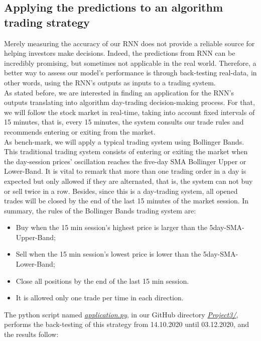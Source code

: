 \subsection{Applying the predictions to an algorithm trading strategy}
\label{chap:Applying the predictions to an algorithm trading strategy}

\quad Merely measuring the accuracy of our RNN does not provide a reliable source for helping investors make decisions. Indeed, the predictions from RNN can be incredibly promising, but sometimes not applicable in the real world. Therefore, a better way to assess our model's performance is through back-testing real-data, in other words, using the RNN's outputs as inputs to a trading system.\\

As stated before, we are interested in finding an application for the RNN's outputs translating into algorithm day-trading decision-making process. For that, we will follow the stock market in real-time, taking into account fixed intervals of 15 minutes, that is, every 15 minutes, the system consults our trade rules and recommends entering or exiting from the market.\\

As bench-mark, we will apply a typical trading system using Bollinger Bands. This traditional trading system consists of entering or exiting the market when the day-session prices' oscillation reaches the five-day SMA Bollinger Upper or Lower-Band. It is vital to remark that more than one trading order in a day is expected but only allowed if they are alternated, that is, the system can not buy or sell twice in a row. Besides, since this is a day-trading system, all opened trades will be closed by the end of the last 15 minutes of the market session. In summary, the rules of the Bollinger Bands trading system are:

\begin{itemize}
    \item Buy when the 15 min session's highest price is larger than the 5day-SMA-Upper-Band;
    \item Sell when the 15 min session's lowest price is lower than the 5day-SMA-Lower-Band;
    \item Close all positions by the end of the last 15 min session.
    \item It is allowed only one trade per time in each direction.
\end{itemize}

The python script named \href{https://github.com/fabiorodp/UiO-FYS-STK4155/tree/master/Project3/application.py}{\textit{application.py}}, in our GitHub directory \href{https://github.com/fabiorodp/UiO-FYS-STK4155/tree/master/Project3/}{\textit{Project3/}}, performs the back-testing of this strategy from 14.10.2020 until 03.12.2020, and the results follow:

